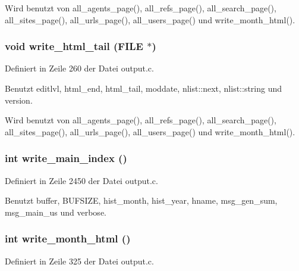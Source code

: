 Wird benutzt von all\_\-agents\_\-page(), all\_\-refs\_\-page(), all\_\-search\_\-page(), all\_\-sites\_\-page(), all\_\-urls\_\-page(), all\_\-users\_\-page() und write\_\-month\_\-html().
\subsubsection{\setlength{\rightskip}{0pt plus 5cm}void write\_\-html\_\-tail (FILE $\ast$)}\label{output_8c_b5fc0fbb03c2b6a431bef6bc473505e2}




Definiert in Zeile 260 der Datei output.c.

Benutzt editlvl, html\_\-end, html\_\-tail, moddate, nlist::next, nlist::string und version.

Wird benutzt von all\_\-agents\_\-page(), all\_\-refs\_\-page(), all\_\-search\_\-page(), all\_\-sites\_\-page(), all\_\-urls\_\-page(), all\_\-users\_\-page() und write\_\-month\_\-html().
\subsubsection{\setlength{\rightskip}{0pt plus 5cm}int write\_\-main\_\-index ()}\label{output_8c_90b458b70bbeed91acc9ec79062f6ac7}




Definiert in Zeile 2450 der Datei output.c.

Benutzt buffer, BUFSIZE, hist\_\-month, hist\_\-year, hname, msg\_\-gen\_\-sum, msg\_\-main\_\-us und verbose.
\subsubsection{\setlength{\rightskip}{0pt plus 5cm}int write\_\-month\_\-html ()}\label{output_8c_a88c70787fac7e72d1f6509b38b6bcab}




Definiert in Zeile 325 der Datei output.c.

